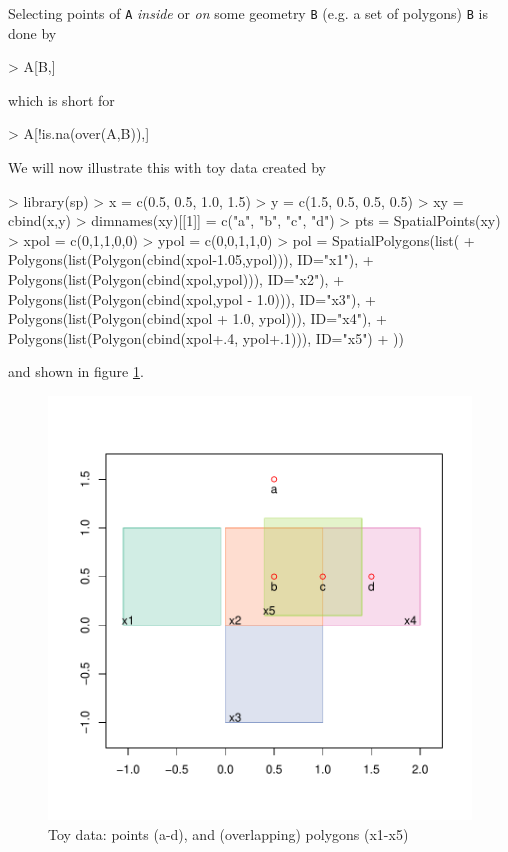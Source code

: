 \documentclass{article}
\newcommand{\code}[1]{{\tt #1}}
\begin{document}
Selecting points of \code{A} {\em inside} or {\em on} some geometry
\code{B} (e.g.  a set of polygons) {\tt B} is done by
\begin{Schunk}
\begin{Sinput}
> A[B,]
\end{Sinput}
\end{Schunk}
which is short for
\begin{Schunk}
\begin{Sinput}
> A[!is.na(over(A,B)),]
\end{Sinput}
\end{Schunk}
We will now illustrate this with toy data created by
\begin{Schunk}
\begin{Sinput}
> library(sp)
> x = c(0.5, 0.5, 1.0, 1.5)
> y = c(1.5, 0.5, 0.5, 0.5)
> xy = cbind(x,y)
> dimnames(xy)[[1]] = c("a", "b", "c", "d")
> pts = SpatialPoints(xy)
> xpol = c(0,1,1,0,0)
> ypol = c(0,0,1,1,0)
> pol = SpatialPolygons(list(
+ 	Polygons(list(Polygon(cbind(xpol-1.05,ypol))), ID="x1"),
+ 	Polygons(list(Polygon(cbind(xpol,ypol))), ID="x2"),
+ 	Polygons(list(Polygon(cbind(xpol,ypol - 1.0))), ID="x3"),
+ 	Polygons(list(Polygon(cbind(xpol + 1.0, ypol))), ID="x4"),
+ 	Polygons(list(Polygon(cbind(xpol+.4, ypol+.1))), ID="x5")
+ 	))
\end{Sinput}
\end{Schunk}
and shown in figure \ref{fig:toy}.

\begin{figure}[htb]
\includegraphics{over-005}
\caption{ Toy data: points (a-d), and (overlapping) polygons (x1-x5) }
\label{fig:toy}
\end{figure}
\end{document}
